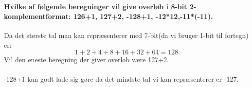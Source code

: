 \documentclass[a4paper,11pt]{article}
\begin{document}
\subsection*{}
\textbf{Hvilke af følgende beregninger vil give overløb i 8-bit 2-komplementformat: 126+1, 127+2, -128+1, -12*12,-11*(-11).}
\\\\
Da det største tal man kan repræsenterer med 7-bit(da vi bruger 1-bit til fortegn) er:
$$1+2+4+8+16+32+64=128$$
Vil den eneste beregning der giver overløb være 127+2.\\
\\
-128+1 kan godt lade sig gøre da det mindste tal vi kan repræsenterer er -127.
\end{document}
